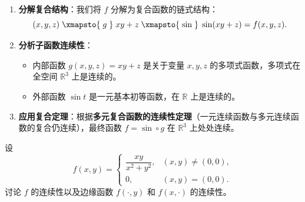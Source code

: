 \documentclass[lang=cn,11pt]{elegantbook}
\begin{document}
\begin{solution}
\begin{enumerate}
  \item \textbf{分解复合结构}：我们将 $f$ 分解为复合函数的链式结构：
  \[
  (x,y,z)\;\xmapsto{\;g\;}\; xy+z\;\xmapsto{\;\sin\;}\; \sin(xy+z)=f(x,y,z).
  \]
  \item \textbf{分析子函数连续性}：
  \begin{itemize}
    \item 内部函数 $g(x,y,z)=xy+z$ 是关于变量 $x, y, z$ 的多项式函数，多项式在全空间 $\mathbb{R}^3$ 上是连续的。
    \item 外部函数 $\sin t$ 是一元基本初等函数，在 $\mathbb{R}$ 上是连续的。
  \end{itemize}
  \item \textbf{应用复合定理}：根据\textbf{多元复合函数的连续性定理}（一元连续函数与多元连续函数的复合仍连续），最终函数 $f=\sin\circ g$ 在 $\mathbb{R}^3$ 上处处连续。
\end{enumerate}
\end{solution}

\begin{exercise}[边缘连续但不整体连续] \label{ex:cont-edge-not-total}
设
\[
f(x,y)=
\begin{cases}
\dfrac{xy}{x^2+y^2},&(x,y) \neq (0,0),\\[8pt]
0,&(x,y)=(0,0).
\end{cases}
\]
讨论 $f$ 的连续性以及边缘函数 $f(\cdot,y)$ 和 $f(x,\cdot)$ 的连续性。
\end{exercise}
\end{document}
